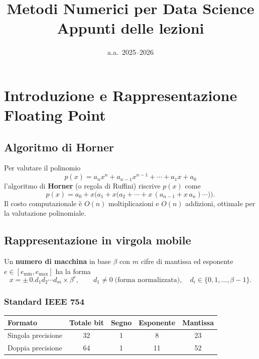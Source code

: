 \documentclass[12pt,a4paper]{article}
\title{\textbf{Metodi Numerici per Data Science}\\
       \large Appunti delle lezioni}
\author{}
\date{a.a.\ 2025--2026}
\theoremstyle{definition}
\begin{document}
\maketitle
\tableofcontents
\newpage

\section{Introduzione e Rappresentazione Floating Point}

\subsection{Algoritmo di Horner}

Per valutare il polinomio
\[
  p(x) = a_n x^n + a_{n-1}x^{n-1} + \cdots + a_1 x + a_0
\]
l'algoritmo di \textbf{Horner} (o regola di Ruffini) riscrive $p(x)$ come
\[
  p(x) = a_0 + x\bigl(a_1 + x\bigl(a_2 + \cdots + x\,(a_{n-1} + x\,a_n)\cdots\bigr)\bigr).
\]
Il costo computazionale è $O(n)$ moltiplicazioni e $O(n)$ addizioni, ottimale per la valutazione polinomiale.

\subsection{Rappresentazione in virgola mobile}

Un \textbf{numero di macchina} in base $\beta$ con $m$ cifre di mantissa ed esponente $e \in [e_{\min}, e_{\max}]$ ha la forma
\[
  x = \pm\, 0.d_1 d_2 \cdots d_m \times \beta^e,
  \qquad d_1 \neq 0 \;\text{(forma normalizzata)},
  \quad d_i \in \{0,1,\ldots,\beta-1\}.
\]

\subsubsection{Standard IEEE 754}

\begin{center}
\begin{tabular}{lcccc}
\toprule
Formato & Totale bit & Segno & Esponente & Mantissa \\
\midrule
Singola precisione  & 32 & 1 & 8  & 23 \\
Doppia precisione   & 64 & 1 & 11 & 52 \\
\bottomrule
\end{tabular}
\end{center}
\end{document}
